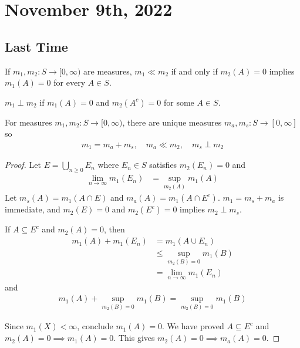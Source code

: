 \section{November 9th, 2022}

\subsection*{Last Time}

\begin{definition}
	If $m_1, m_2 : S \to [0, \infty)$ are measures, $m_1 \ll m_2$
	if and only if $m_{2} (A) = 0 $ implies $m_{1} (A) = 0$ for every $A \in S$.
\end{definition}

\begin{definition}
	$m_1 \perp m_2$ if $m_1(A) = 0$ and $m_2(A^c) = 0$ for some $A \in S$.
\end{definition}


\begin{theorem}
	For measures $m_1, m_2 : S \to [0, \infty)$, there are unique measures  $m_a, m_{s} : S \to [0, \infty]$ so
	\begin{align*}
		m_1 = m_a + m_s, \quad m_a \ll m_2, \quad m_s \perp m_2
	\end{align*}
\end{theorem}

\begin{proof}
	Let $E = \bigcup_{n \geq 0} E_{n}$ where $E_{n} \in S$ satisfies
	 $m_{2} (E_{n}) = 0$ and
	 \begin{align*}
		 \lim_{n \to \infty} m_{1} (E_{n}) &= \sup_{m_{2} (A)} m_1 (A)
	 \end{align*}
	Let $m_s (A) = m_1 (A \cap E)$ and $m_a (A) = m_{1} (A \cap E^c)$.
	$m_1 = m_s + m_a$ is immediate, and
	$m_2 (E) = 0$ and $m_2 (E^c) = 0$ implies $m_2 \perp m_s$.

	 If $A \subseteq E^c$ and $m_2 (A) = 0$, then
	 \begin{align*}
		 m_1 (A) + m_1 (E_n) &= m_1 (A \cup E_n) \\
							 &\leq \sup_{m_2 (B) = 0} m_1 (B) \\
							 &= \lim_{n \to \infty} m_1 (E_n)
	 \end{align*}
	 and
	 \begin{align*}
	 	m_1 (A) + \sup_{m_2 (B) = 0} m_1 (B) = \sup_{m_2 (B) = 0} m_1 (B)
	 \end{align*}

	 Since $m_1 (X) < \infty$, conclude $m_1 (A) = 0$.
	 We have proved  $A \subseteq  E^c$ and $m_2 (A) = 0 \implies m_1 (A) = 0$.
	 This gives $m_2 (A) = 0 \implies m_a (A) = 0$.
\end{proof}

